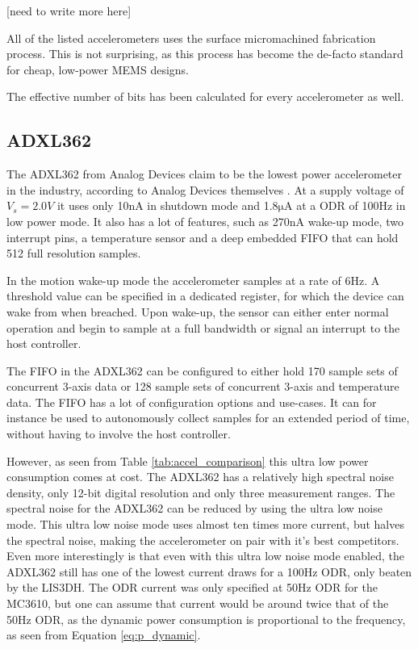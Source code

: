 [need to write more here]

All of the listed accelerometers uses the surface micromachined fabrication process. This is not surprising, as this process has become the de-facto standard for cheap, low-power MEMS designs.

The effective number of bits has been calculated for every accelerometer as well.

\subsection{ADXL362}

The ADXL362 from Analog Devices claim to be the lowest power accelerometer in the industry, according to Analog Devices themselves \cite{analog12}. At a supply voltage of $V_s = 2.0 V$ it uses only 10nA in shutdown mode and 1.8$\si{\micro\ampere}$ at a ODR of 100Hz in low power mode. It also has a lot of features, such as 270nA wake-up mode, two interrupt pins, a temperature sensor and a deep embedded FIFO that can hold 512 full resolution samples. 

In the motion wake-up mode the accelerometer samples at a rate of 6Hz. A threshold value can be specified in a dedicated register, for which the device can wake from when breached. Upon wake-up, the sensor can either enter normal operation and begin to sample at a full bandwidth or signal an interrupt to the host controller. 

The FIFO in the ADXL362 can be configured to either hold 170 sample sets of concurrent 3-axis data or 128 sample sets of concurrent 3-axis and temperature data. The FIFO has a lot of configuration options and use-cases. It can for instance be used to autonomously collect samples for an extended period of time, without having to involve the host controller.

However, as seen from Table \ref{tab:accel_comparison} this ultra low power consumption comes at cost. The ADXL362 has a relatively high spectral noise density, only 12-bit digital resolution and only three measurement ranges. The spectral noise for the ADXL362 can be reduced by using the ultra low noise mode. This ultra low noise mode uses almost ten times more current, but halves the spectral noise, making the accelerometer on pair with it's best competitors. Even more interestingly is that even with this ultra low noise mode enabled, the ADXL362 still has one of the lowest current draws for a 100Hz ODR, only beaten by the LIS3DH. The ODR current was only specified at 50Hz ODR for the MC3610, but one can assume that current would be around twice that of the 50Hz ODR, as the dynamic power consumption is proportional to the frequency, as seen from Equation \ref{eq:p_dynamic}.

